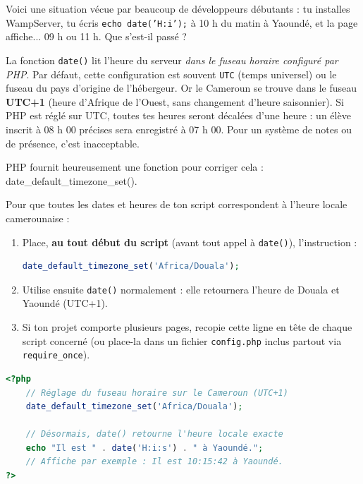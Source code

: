 \documentclass[11pt]{article}
\newcommand{\cle}[1]{{\popxbold\color{popdark}#1}}
\newcounter{popsec}
\newcounter{popsub}
\newcommand{\courssub}[1]{%
  \stepcounter{popsub}%
  \par\vspace{9pt}\noindent{\popxbold\fontsize{11.5}{13}\selectfont\color{popink}{\color{poporange}\thepopsec.\thepopsub}\hspace{6pt}#1}\par\nopagebreak\vspace{4pt}
}
\begin{document}
\courssub{Le problème du fuseau horaire}

Voici une situation vécue par beaucoup de développeurs débutants : tu installes WampServer, tu écris \texttt{echo date('H:i');} à 10 h du matin à Yaoundé, et la page affiche... 09 h ou 11 h. Que s'est-il passé ?

La fonction \texttt{date()} lit l'heure du serveur \emph{dans le fuseau horaire configuré par PHP}. Par défaut, cette configuration est souvent \texttt{UTC} (temps universel) ou le fuseau du pays d'origine de l'hébergeur. Or le Cameroun se trouve dans le fuseau \textbf{UTC+1} (heure d'Afrique de l'Ouest, sans changement d'heure saisonnier). Si PHP est réglé sur UTC, toutes tes heures seront décalées d'une heure : un élève inscrit à 08 h 00 précises sera enregistré à 07 h 00. Pour un système de notes ou de présence, c'est inacceptable.

PHP fournit heureusement une fonction pour corriger cela : \cle{date\_default\_timezone\_set()}.

\begin{methode}
Pour que toutes les dates et heures de ton script correspondent à l'heure locale camerounaise :
\begin{enumerate}
\item Place, \textbf{au tout début du script} (avant tout appel à \texttt{date()}), l'instruction :
\begin{lstlisting}[language=Php]
date_default_timezone_set('Africa/Douala');
\end{lstlisting}
\item Utilise ensuite \texttt{date()} normalement : elle retournera l'heure de Douala et Yaoundé (UTC+1).
\item Si ton projet comporte plusieurs pages, recopie cette ligne en tête de chaque script concerné (ou place-la dans un fichier \texttt{config.php} inclus partout via \texttt{require\_once}).
\end{enumerate}
\end{methode}

\begin{exemplebox}
\begin{lstlisting}[language=Php]
<?php
    // Réglage du fuseau horaire sur le Cameroun (UTC+1)
    date_default_timezone_set('Africa/Douala');

    // Désormais, date() retourne l'heure locale exacte
    echo "Il est " . date('H:i:s') . " à Yaoundé.";
    // Affiche par exemple : Il est 10:15:42 à Yaoundé.
?>
\end{lstlisting}
\end{exemplebox}
\end{document}
